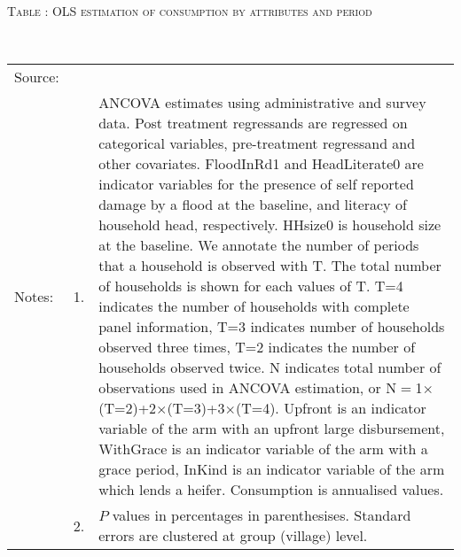 \hspace{-1cm}\begin{minipage}[t]{14cm}
\hfil\textsc{\normalsize Table \thetable: OLS estimation of consumption by attributes and period\label{tab OLS consumption timevarying attributes original HH}}\\
\setlength{\tabcolsep}{1pt}
\setlength{\baselineskip}{8pt}
\renewcommand{\arraystretch}{.55}
\hfil{}\\
\renewcommand{\arraystretch}{.8}
\setlength{\tabcolsep}{1pt}
\begin{tabular}{>{\hfill\scriptsize}p{1cm}<{}>{\hfill\scriptsize}p{.25cm}<{}>{\scriptsize}p{12cm}<{\hfill}}
Source:& \multicolumn{2}{l}{\scriptsize Estimated with GUK administrative and survey data.}\\
Notes: & 1. & ANCOVA estimates using administrative and survey data. Post treatment regressands are regressed on categorical variables, pre-treatment regressand and other covariates. \textsf{FloodInRd1} and \textsf{HeadLiterate0} are indicator variables for the presence of self reported damage by a flood at the baseline, and literacy of household head, respectively. \textsf{HHsize0} is household size at the baseline. We annotate the number of periods that a household is observed with \textsf{T}. The total number of households is shown for each values of \textsf{T}. \textsf{T=4} indicates the number of households with complete panel information, \textsf{T=3} indicates number of households observed three times, \textsf{T=2} indicates the number of households observed twice. \textsf{N} indicates total number of observations used in ANCOVA estimation, or \textsf{N$=$1$\times$(T=2)+2$\times$(T=3)+3$\times$(T=4)}.  \textsf{Upfront} is an indicator variable of the arm with an upfront large disbursement, \textsf{WithGrace} is an indicator variable of the arm with a grace period, \textsf{InKind} is an indicator variable of the arm which lends a heifer. Consumption is annualised values. \\
& 2. & $P$ values in percentages in parenthesises. Standard errors are clustered at group (village) level.
\end{tabular}
\end{minipage}



